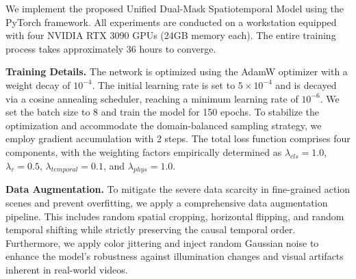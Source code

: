 \documentclass[lettersize,journal]{IEEEtran}
\begin{document}
\begin{table}[t]
\centering
\caption{Summary of the Video Action Datasets Used for Training and Evaluation}
\label{tab:datasets}
\end{table}

We implement the proposed Unified Dual-Mask Spatiotemporal Model using the PyTorch framework. All experiments are conducted on a workstation equipped with four NVIDIA RTX 3090 GPUs (24GB memory each). The entire training process takes approximately 36 hours to converge.

\textbf{Training Details.} The network is optimized using the AdamW optimizer with a weight decay of $10^{-4}$. The initial learning rate is set to $5 \times 10^{-4}$ and is decayed via a cosine annealing scheduler, reaching a minimum learning rate of $10^{-6}$. We set the batch size to 8 and train the model for 150 epochs. To stabilize the optimization and accommodate the domain-balanced sampling strategy, we employ gradient accumulation with 2 steps. The total loss function comprises four components, with the weighting factors empirically determined as $\lambda_{cls} = 1.0$, $\lambda_{r} = 0.5$, $\lambda_{temporal} = 0.1$, and $\lambda_{phys} = 1.0$.

\textbf{Data Augmentation.} To mitigate the severe data scarcity in fine-grained action scenes and prevent overfitting, we apply a comprehensive data augmentation pipeline. This includes random spatial cropping, horizontal flipping, and random temporal shifting while strictly preserving the causal temporal order. Furthermore, we apply color jittering and inject random Gaussian noise to enhance the model's robustness against illumination changes and visual artifacts inherent in real-world videos.
\end{document}
